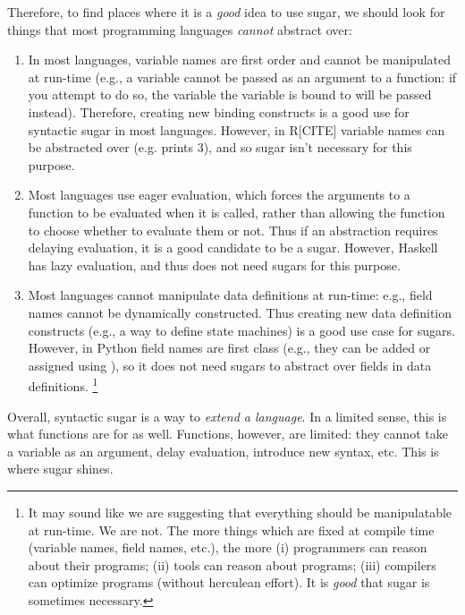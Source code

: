 Therefore, to find places where it is a \emph{good} idea to use sugar,
we should look for things that most programming languages
\emph{cannot} abstract over:
\begin{enumerate}
  \item In most languages, variable names are first order and cannot
    be manipulated at run-time (e.g., a variable cannot be passed as
    an argument to a function: if you attempt to do so, the variable the
    variable is bound to will be passed instead). Therefore, creating
    new binding constructs is a good use for syntactic sugar in most
    languages. However, in R[CITE] variable names can be abstracted
    over (e.g.  prints 3), and so sugar isn't
    necessary for this purpose.
  \item Most languages use eager evaluation,
    which forces the arguments to a function to be
    evaluated when it is called, rather than allowing the function to
    choose whether to
    evaluate them or not. Thus if an abstraction requires delaying
    evaluation, it is a good candidate to be a sugar. However, Haskell
    has lazy evaluation, and thus does not need sugars for this purpose.
  \item Most languages cannot manipulate data definitions at run-time:
    e.g., field names cannot be dynamically constructed. Thus creating
    new data definition constructs (e.g., a way to define state
    machines) is a good use case for sugars. However, in Python field
    names are first class (e.g., they can be added or assigned using
    ), so it does not need sugars to abstract over fields
    in data definitions.%
    \footnote{
    It may sound like we are suggesting that everything should be
    manipulatable at run-time. We are not. The more
    things which are fixed at compile time (variable names, field
    names, etc.), the more (i) programmers can reason about their
    programs; (ii) tools can reason about programs; (iii) compilers
    can optimize programs (without herculean effort). It is
    \emph{good} that sugar is sometimes necessary.
  }
\end{enumerate}

Overall, syntactic sugar is a way to \emph{extend a language}.
In a limited sense, this is what functions are for as well.
Functions, however, are limited: they cannot take a variable as an
argument, delay evaluation, introduce new syntax, etc. This is where
sugar shines.
